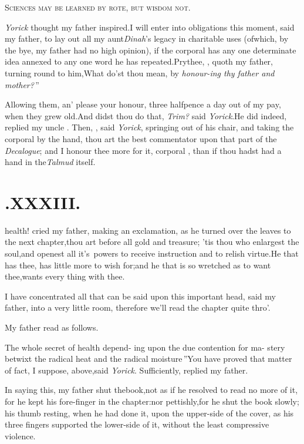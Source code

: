 \documentclass[twoside]{article}
\begin{document}
\tsk \textsc{Sciences may be learned by rote, but wisdom not}.


\textit{Yorick} thought my father inspired.\tsk I will enter into obligations
this moment, said my father, to lay out all my aunt\break \textit{Dinah}’s legacy
in charitable uses (of\break which, by the bye, my father had no high opinion), if
the corporal has any one determinate idea annexed to any one word he has
repeated.\tsk Prythee, \trim, quoth my father, turning round to
him,\break\tsk What do’st thou mean, by
\lqq\textit{honour-\break\lqq ing thy father and mother?}\,”


Allowing them, an’ please your ho\-nour, three halfpence a
day out of my pay, when they grew old.\tsk And didst thou do
that, \textit{Trim?} said \textit{Yorick}.\tsk He did indeed, replied
my uncle \toby.\tsk\break
Then, \trim, said \textit{Yorick}, springing out\break
of his chair, and taking the corporal by\break
the hand, thou art the best commentator upon that part of the
\textit{Decalogue}; and I honour thee more for it, corporal \trim, than
if thou hadst had a hand in the\break\textit{Talmud} itself.

\section{.\enspace  XXXIII.}

 health! cried my father,
making an exclamation, as he\break
turned over the leaves to the next
chapter,\tsk thou art before all gold and treasure; ’tis thou who
enlargest the soul,\tsk and openest all it’s\sic\ powers to receive
instruction and to relish virtue.\tsk He that has thee, has
little more to wish for;\tsk and he that is so wretched as to
want thee,\tsk wants every thing with thee.\etp

I have concentrated all that can be said upon this important
head, said my father, into a very little room, therefore
we’ll read the chapter quite thro’.

My father read as follows.

\indent\lqq The whole secret of health depend-\break
\lqq ing upon the due contention for ma-\break
\lqq stery betwixt the radical heat and the\break
\lqq radical moisture\,”\tsk You have proved
that matter of fact, I suppose, above,\break said \textit{Yorick}. Sufficiently,
replied my father.


In saying this, my father shut the\break book,\tsk not as if he resolved to read no
more of it, for he kept his fore-finger in the chapter:\tsh nor pettishly,\tsk for
he shut the book slowly; his thumb resting, when he had done it, upon the upper-side
of the cover, as his three fingers supported the lower-side of it, without the least
compressive violence.\tsh{}
\end{document}
